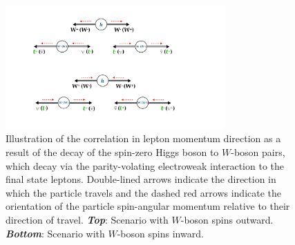 \begin{figure}[!htb]
    \begin{center}
        \includegraphics[width=0.75\textwidth]{figures/search_hh/signal_pheno/hdecay_wwPDF}
        \caption{
            Illustration of the correlation in lepton momentum direction as a result of the decay of the
            spin-zero Higgs boson to $W$-boson pairs, which decay via the parity-volating electroweak interaction
            to the final state leptons.
            Double-lined arrows indicate the direction in which the particle travels and the
            dashed red arrows indicate the orientation of the particle spin-angular momentum relative to their direction of travel.
            \textit{\textbf{Top}}: Scenario with $W$-boson spins outward.
            \textit{\textbf{Bottom}}: Scenario with $W$-boson spins inward.
        }
        \label{fig:hdecay_ww}
    \end{center}
\end{figure}

